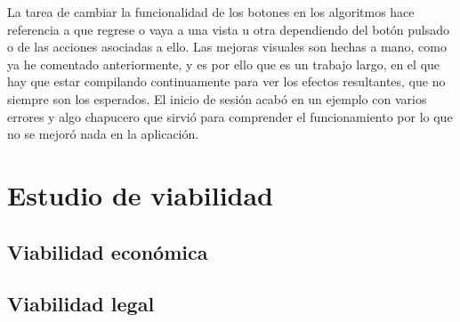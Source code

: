La tarea de cambiar la funcionalidad de los botones en los algoritmos hace referencia a que regrese o vaya a una vista u otra dependiendo del botón pulsado o de las acciones asociadas a ello.
Las mejoras visuales son hechas a mano, como ya he comentado anteriormente, y es por ello que es un trabajo largo, en el que hay que estar compilando continuamente para ver los efectos resultantes, que no siempre son los esperados.
El inicio de sesión acabó en un ejemplo con varios errores y algo chapucero que sirvió para comprender el funcionamiento por lo que no se mejoró nada en la aplicación.

\section{Estudio de viabilidad}

\subsection{Viabilidad económica}

\subsection{Viabilidad legal}


